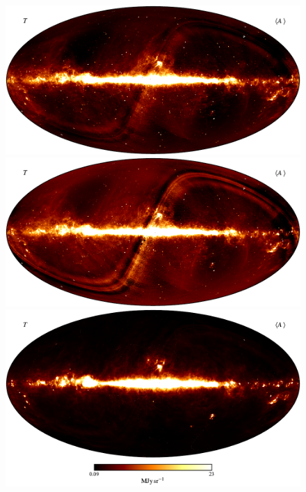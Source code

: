 \documentclass{aa}
\begin{document}
\begin{figure}
	\centering
	\includegraphics[width=0.6\linewidth]{figs/CG_DIRBE_05_n0512_v05_I_MEAN_w18_n512_c-afmhot.pdf}\\
        \includegraphics[width=0.6\linewidth]{figs/CG_DIRBE_06_n0512_v05_I_MEAN_w18_n512_c-afmhot.pdf}\\
        \includegraphics[width=0.6\linewidth]{figs/CG_DIRBE_07_n0512_v05_I_MEAN_w18_n512_cb_c-afmhot.pdf}
	\caption{}
	\label{fig:freqmaps5_7}
\end{figure}
\end{document}
